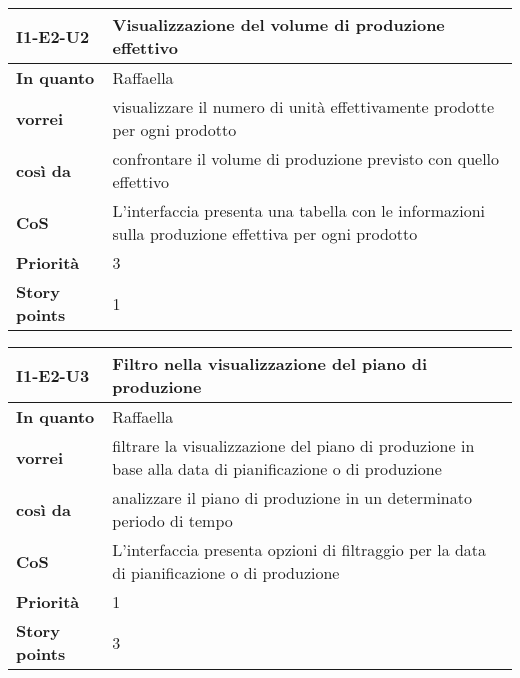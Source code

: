 \begin{table}[H]
  \begin{tabularx}{\textwidth}{lX}
    \toprule
    \textbf{I1-E2-U2} & \textbf{Visualizzazione del volume di produzione effettivo} \\
    \midrule
    \textbf{In quanto} & Raffaella \\
    \textbf{vorrei} & visualizzare il numero di unità effettivamente prodotte per ogni prodotto \\
    \textbf{così da} & confrontare il volume di produzione previsto con quello effettivo \\
    \midrule
    \textbf{CoS} & L'interfaccia presenta una tabella con le informazioni sulla produzione effettiva per ogni prodotto \\
    \midrule
    \textbf{Priorità} & 3 \\
    \textbf{Story points} & 1 \\
    \bottomrule
  \end{tabularx}
  \label{user-story:i1-e2-u2}
\end{table}

\begin{table}[H]
  \begin{tabularx}{\textwidth}{lX}
    \toprule
    \textbf{I1-E2-U3} & \textbf{Filtro nella visualizzazione del piano di produzione} \\
    \midrule
    \textbf{In quanto} & Raffaella \\
    \textbf{vorrei} & filtrare la visualizzazione del piano di produzione in base alla data di pianificazione o di produzione \\
    \textbf{così da} & analizzare il piano di produzione in un determinato periodo di tempo \\
    \midrule
    \textbf{CoS} & L'interfaccia presenta opzioni di filtraggio per la data di pianificazione o di produzione \\
    \midrule
    \textbf{Priorità} & 1 \\
    \textbf{Story points} & 3 \\
    \bottomrule
  \end{tabularx}
  \label{user-story:i1-e2-u3}
\end{table}

